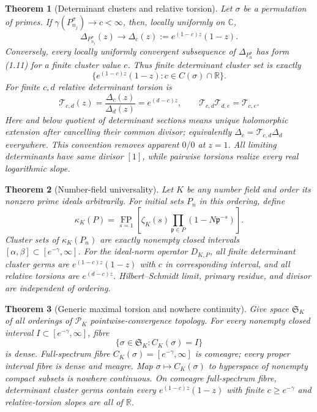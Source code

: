 \documentclass[11pt]{article}
\newtheorem{theorem}{Theorem}[section]
\theoremstyle{definition}
\theoremstyle{remark}
\newcommand{\R}{\mathbb R}
\newcommand{\C}{\mathbb C}
\newcommand{\cT}{\mathcal T}
\newcommand{\FP}{\operatorname*{FP}}
\begin{document}
\begin{theorem}[Determinant clusters and relative torsion]
\label{thm:clusters}
Let $\sigma$ be a permutation of primes.  If
$\gamma(P_{n_j}^\sigma)\to c<\infty$, then, locally uniformly on $\C$,
\begin{equation}
 \Delta_{P_{n_j}^\sigma}(z)\longrightarrow
 \Delta_c(z):=e^{(1-c)z}(1-z).                            \tag{1.11}
\end{equation}
Conversely, every locally uniformly convergent subsequence of
$\Delta_{P_n^\sigma}$ has form \emph{(1.11)} for a finite cluster value $c$.
Thus finite determinant cluster set is exactly
\begin{equation}
 \{e^{(1-c)z}(1-z):c\in C(\sigma)\cap\R\}.                \tag{1.12}
\end{equation}
For finite $c,d$ relative determinant torsion is
\begin{equation}
 \cT_{c,d}(z)=\frac{\Delta_c(z)}{\Delta_d(z)}
 =e^{(d-c)z},\qquad
 \cT_{c,d}\cT_{d,e}=\cT_{c,e}.                           \tag{1.13}
\end{equation}
Here and below quotient of determinant sections means unique holomorphic extension after
cancelling their common divisor; equivalently
$\Delta_c=\cT_{c,d}\Delta_d$ everywhere.  This convention removes apparent $0/0$ at $z=1$.
All limiting determinants have same divisor $[1]$, while pairwise torsions realize every real
logarithmic slope.
\end{theorem}

\begin{theorem}[Number-field universality]
\label{thm:numberfield-main}
Let $K$ be any number field and order its nonzero prime ideals arbitrarily.  For initial sets
$P_n$ in this ordering, define
\[
 \kappa_K(P)=\FP_{s=1}\left[
 \zeta_K(s)\prod_{\mathfrak p\in P}(1-N\mathfrak p^{-s})\right].
\]
Cluster sets of $\kappa_K(P_n)$ are exactly nonempty closed intervals
$[\alpha,\beta]\subset[e^{-\gamma},\infty]$.  For the ideal-norm operator $D_{K,P}$, all finite
determinant cluster germs are $e^{(1-c)z}(1-z)$ with $c$ in corresponding interval, and all
relative torsions are $e^{(d-c)z}$.  Hilbert--Schmidt limit, primary residue, and divisor are
independent of ordering.
\end{theorem}

\begin{theorem}[Generic maximal torsion and nowhere continuity]
\label{thm:generic}
Give space $\mathfrak S_K$ of all orderings of $\mathcal P_K$ pointwise-convergence topology.
For every nonempty closed interval $I\subset[e^{-\gamma},\infty]$, fibre
\[
 \{\sigma\in\mathfrak S_K:C_K(\sigma)=I\}
\]
is dense.  Full-spectrum fibre $C_K(\sigma)=[e^{-\gamma},\infty]$ is comeagre; every proper
interval fibre is dense and meagre.  Map $\sigma\mapsto C_K(\sigma)$ to hyperspace of nonempty
compact subsets is nowhere continuous.  On comeagre full-spectrum fibre, determinant cluster
germs contain every $e^{(1-c)z}(1-z)$ with finite $c\geq e^{-\gamma}$ and relative-torsion slopes
are all of $\R$.
\end{theorem}
\end{document}
